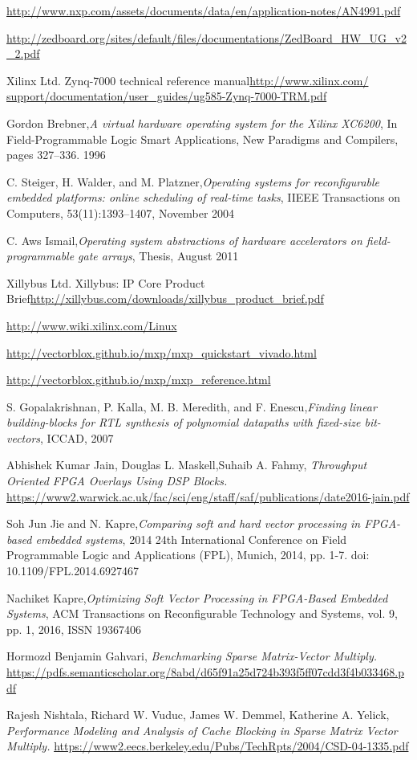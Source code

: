 \begin{thebibliography}{1}
	\url{http://www.nxp.com/assets/documents/data/en/application-notes/AN4991.pdf}
	
	\url{http://zedboard.org/sites/default/files/documentations/ZedBoard_HW_UG_v2_2.pdf}
	
	Xilinx Ltd. Zynq-7000 technical reference manual\url{http://www.xilinx.com/
		support/documentation/user_guides/ug585-Zynq-7000-TRM.pdf}
	
	Gordon Brebner,\emph{A virtual hardware operating system for the Xilinx XC6200}, In
	Field-Programmable Logic Smart Applications, New Paradigms and Compilers,
	pages 327–336. 1996
	
	C. Steiger, H. Walder, and M. Platzner,\emph{Operating systems for reconfigurable
		embedded platforms: online scheduling of real-time tasks}, IIEEE Transactions
	on Computers, 53(11):1393–1407, November 2004
	
	C. Aws Ismail,\emph{Operating system abstractions of hardware accelerators on field-
		programmable gate arrays}, Thesis, August 2011
	
	Xillybus Ltd. Xillybus: IP Core Product Brief\url{http://xillybus.com/downloads/xillybus_product_brief.pdf}
	
	\url{http://www.wiki.xilinx.com/Linux}
	
	\url{http://vectorblox.github.io/mxp/mxp_quickstart_vivado.html}
	
	\url{http://vectorblox.github.io/mxp/mxp_reference.html}
	
	S. Gopalakrishnan, P. Kalla, M. B. Meredith, and F. Enescu,\emph{Finding
		linear building-blocks for RTL synthesis of polynomial datapaths with
		fixed-size bit-vectors}, ICCAD, 2007
	
	Abhishek Kumar Jain, Douglas L. Maskell,Suhaib A. Fahmy, \emph{Throughput Oriented FPGA Overlays Using DSP Blocks.}
	\url{https://www2.warwick.ac.uk/fac/sci/eng/staff/saf/publications/date2016-jain.pdf}
	
	Soh Jun Jie and N. Kapre,\emph{Comparing soft and hard vector processing in FPGA-based embedded systems}, 2014 24th International Conference on Field Programmable Logic and Applications (FPL), Munich, 2014, pp. 1-7.
	doi: 10.1109/FPL.2014.6927467
	
	Nachiket Kapre,\emph{Optimizing Soft Vector Processing in FPGA-Based Embedded Systems}, ACM Transactions on Reconfigurable Technology and Systems, vol. 9, pp. 1, 2016, ISSN 19367406
	
	Hormozd Benjamin Gahvari, \emph{Benchmarking Sparse Matrix-Vector Multiply.}
	\url{https://pdfs.semanticscholar.org/8abd/d65f91a25d724b393f5ff07cdd3f4b033468.pdf}
	
	Rajesh Nishtala, Richard W. Vuduc, James W. Demmel, Katherine A. Yelick, \emph{Performance Modeling and Analysis of Cache Blocking in Sparse Matrix Vector Multiply.
	}
	\url{https://www2.eecs.berkeley.edu/Pubs/TechRpts/2004/CSD-04-1335.pdf}
	
	
	
\end{thebibliography}

